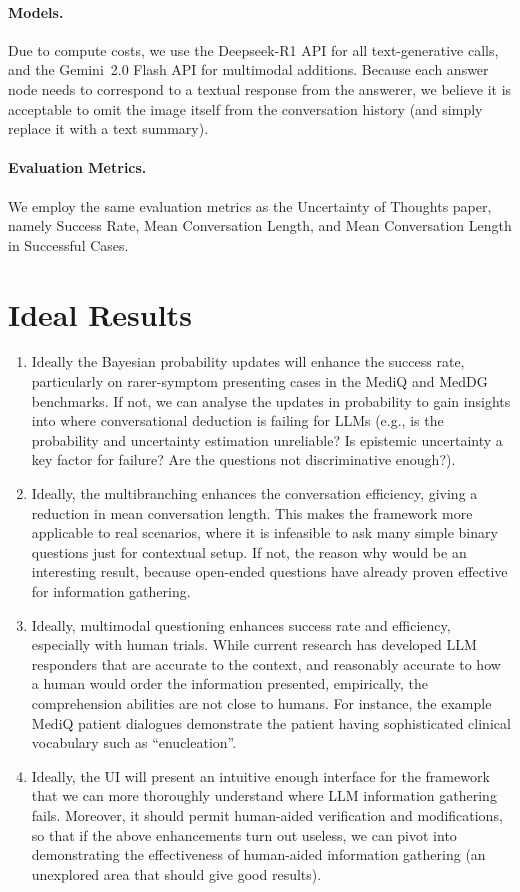 \documentclass{article} %
\begin{document}
\paragraph{Models.}
Due to compute costs, we use the Deepseek-R1 API for all text-generative calls, and the Gemini~2.0 Flash API for multimodal additions. Because each answer node needs to correspond to a textual response from the answerer, we believe it is acceptable to omit the image itself from the conversation history (and simply replace it with a text summary).

\paragraph{Evaluation Metrics.}
We employ the same evaluation metrics as the Uncertainty of Thoughts paper, namely Success Rate, Mean Conversation Length, and Mean Conversation Length in Successful Cases.

\section{Ideal Results}

\begin{enumerate}
    \item Ideally the Bayesian probability updates will enhance the success rate, particularly on rarer-symptom presenting cases in the MediQ and MedDG benchmarks. If not, we can analyse the updates in probability to gain insights into where conversational deduction is failing for LLMs (e.g., is the probability and uncertainty estimation unreliable? Is epistemic uncertainty a key factor for failure? Are the questions not discriminative enough?).
    \item Ideally, the multibranching enhances the conversation efficiency, giving a reduction in mean conversation length. This makes the framework more applicable to real scenarios, where it is infeasible to ask many simple binary questions just for contextual setup. If not, the reason why would be an interesting result, because open-ended questions have already proven effective for information gathering.
    \item Ideally, multimodal questioning enhances success rate and efficiency, especially with human trials. While current research has developed LLM responders that are accurate to the context, and reasonably accurate to how a human would order the information presented, empirically, the comprehension abilities are not close to humans. For instance, the example MediQ patient dialogues demonstrate the patient having sophisticated clinical vocabulary such as ``enucleation''.
    \item Ideally, the UI will present an intuitive enough interface for the framework that we can more thoroughly understand where LLM information gathering fails. Moreover, it should permit human-aided verification and modifications, so that if the above enhancements turn out useless, we can pivot into demonstrating the effectiveness of human-aided information gathering (an unexplored area that should give good results).
\end{enumerate}
\end{document}
